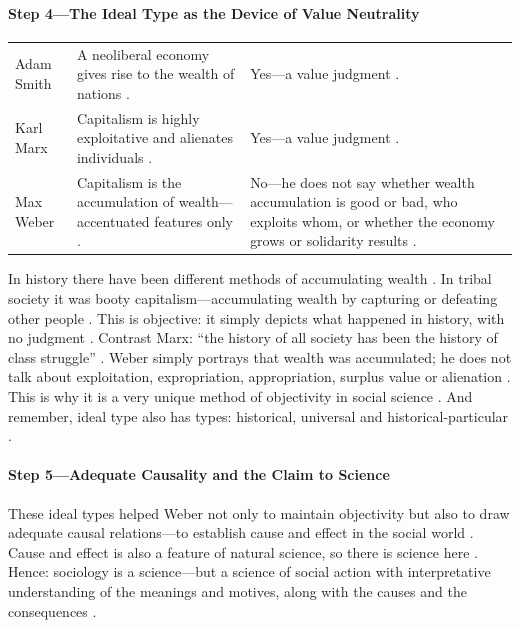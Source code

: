\paragraph{Step 4---The Ideal Type as the Device of Value Neutrality}
\vspace{6pt}
\noindent
\begin{tabularx}{\textwidth}{>{\hsize}Y >{\hsize}Y >{\hsize}Y}
\toprule
{}
 &  &  \\
\midrule
Adam Smith & A neoliberal economy gives rise to the wealth of nations . & Yes---a value judgment . \\
\midrule
Karl Marx & Capitalism is highly exploitative and alienates individuals . & Yes---a value judgment . \\
\midrule
Max Weber & Capitalism is the accumulation of wealth---accentuated features only . & No---he does not say whether wealth accumulation is good or bad, who exploits whom, or whether the economy grows or solidarity results . \\
\bottomrule
\end{tabularx}
\vspace{6pt}

In history there have been different methods of accumulating wealth . In tribal society it was booty capitalism---accumulating wealth by capturing or defeating other people . This is objective: it simply depicts what happened in history, with no judgment .
Contrast Marx: ``the history of all society has been the history of class struggle'' . Weber simply portrays that wealth was accumulated; he does not talk about exploitation, expropriation, appropriation, surplus value or alienation .
This is why it is a very unique method of objectivity in social science . And remember, ideal type also has types: historical, universal and historical-particular .

\paragraph{Step 5---Adequate Causality and the Claim to Science}
These ideal types helped Weber not only to maintain objectivity but also to draw adequate causal relations---to establish cause and effect in the social world . Cause and effect is also a feature of natural science, so there is science here .
Hence: sociology is a science---but a science of social action with interpretative understanding of the meanings and motives, along with the causes and the consequences .


